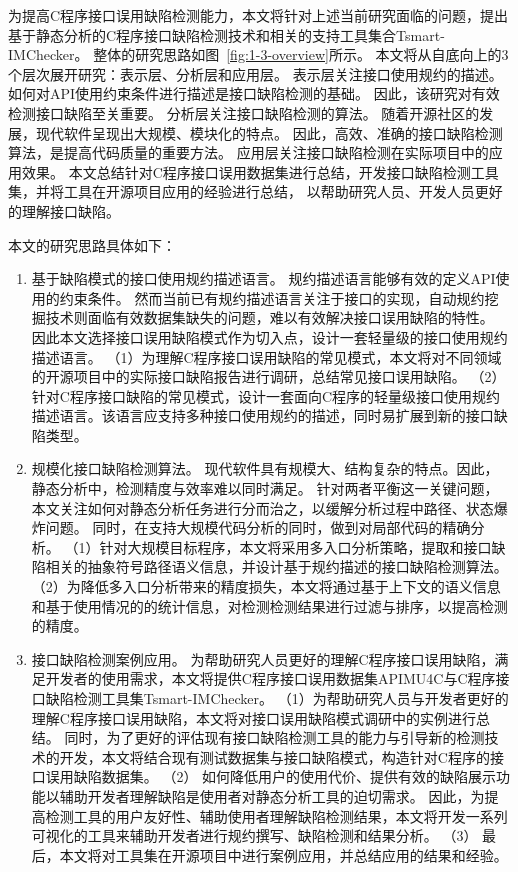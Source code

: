为提高C程序接口误用缺陷检测能力，本文将针对上述当前研究面临的问题，提出基于静态分析的C程序接口缺陷检测技术和相关的支持工具集合Tsmart-IMChecker。
整体的研究思路如图~\ref{fig:1-3-overview}所示。
本文将从自底向上的3个层次展开研究：表示层、分析层和应用层。
表示层关注接口使用规约的描述。
如何对API使用约束条件进行描述是接口缺陷检测的基础。
因此，该研究对有效检测接口缺陷至关重要。
分析层关注接口缺陷检测的算法。
随着开源社区的发展，现代软件呈现出大规模、模块化的特点。
因此，高效、准确的接口缺陷检测算法，是提高代码质量的重要方法。
应用层关注接口缺陷检测在实际项目中的应用效果。
本文总结针对C程序接口误用数据集进行总结，开发接口缺陷检测工具集，并将工具在开源项目应用的经验进行总结，
以帮助研究人员、开发人员更好的理解接口缺陷。

本文的研究思路具体如下：
\begin{enumerate}
	\item {\kaishu 基于缺陷模式的接口使用规约描述语言。}
	规约描述语言能够有效的定义API使用的约束条件。
	然而当前已有规约描述语言关注于接口的实现，自动规约挖掘技术则面临有效数据集缺失的问题，难以有效解决接口误用缺陷的特性。
	因此本文选择接口误用缺陷模式作为切入点，设计一套轻量级的接口使用规约描述语言。
	（1）为理解C程序接口误用缺陷的常见模式，本文将对不同领域的开源项目中的实际接口缺陷报告进行调研，总结常见接口误用缺陷。
	（2）针对C程序接口缺陷的常见模式，设计一套面向C程序的轻量级接口使用规约描述语言。该语言应支持多种接口使用规约的描述，同时易扩展到新的接口缺陷类型。
	
	\item {\kaishu 规模化接口缺陷检测算法。}
	现代软件具有规模大、结构复杂的特点。因此，静态分析中，检测精度与效率难以同时满足。
	针对两者平衡这一关键问题，本文关注如何对静态分析任务进行分而治之，以缓解分析过程中路径、状态爆炸问题。
	同时，在支持大规模代码分析的同时，做到对局部代码的精确分析。
	（1）针对大规模目标程序，本文将采用多入口分析策略，提取和接口缺陷相关的抽象符号路径语义信息，并设计基于规约描述的接口缺陷检测算法。
	（2）为降低多入口分析带来的精度损失，本文将通过基于上下文的语义信息和基于使用情况的的统计信息，对检测检测结果进行过滤与排序，以提高检测的精度。
	
	\item {\kaishu 接口缺陷检测案例应用。}
	为帮助研究人员更好的理解C程序接口误用缺陷，满足开发者的使用需求，本文将提供C程序接口误用数据集APIMU4C与C程序接口缺陷检测工具集Tsmart-IMChecker。
	（1）为帮助研究人员与开发者更好的理解C程序接口误用缺陷，本文将对接口误用缺陷模式调研中的实例进行总结。
	同时，为了更好的评估现有接口缺陷检测工具的能力与引导新的检测技术的开发，本文将结合现有测试数据集与接口缺陷模式，构造针对C程序的接口误用缺陷数据集。
	（2）
	如何降低用户的使用代价、提供有效的缺陷展示功能以辅助开发者理解缺陷是使用者对静态分析工具的迫切需求。
	因此，为提高检测工具的用户友好性、辅助使用者理解缺陷检测结果，本文将开发一系列可视化的工具来辅助开发者进行规约撰写、缺陷检测和结果分析。
	（3）
	最后，本文将对工具集在开源项目中进行案例应用，并总结应用的结果和经验。	
\end{enumerate}




